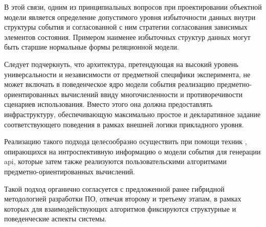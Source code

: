В этой связи, одним из принципиальных вопросов при проектировании объектной
модели является определение допустимого уровня избыточности данных
внутри структуры события и согласованной с ним стратегии
согласования зависимых элементов состояния. Примером наименее избыточных
структур данных могут быть старшие нормальные формы реляционной модели.

Следует подчеркнуть, что архитектура, претендующая на высокий уровень
универсальности и независимости от предметной специфики эксперимента, не может
включать в поведенческое ядро модели события реализацию предметно-ориентированных
вычислений ввиду многочисленности и противоречивости сценариев использования.
Вместо этого она должна предоставлять инфраструктуру, обеспечивающую
максимально простое и декларативное задание соответствующего поведения
в рамках внешней логики прикладного уровня.

Реализацию такого подхода целесообразно осуществить при помощи техник
, опирающихся на интроспективную информацию
о модели события для генерации \acrshort{api}, которые затем также
реализуются пользовательскими алгоритмами предметно-ориентированных
вычислений.

Такой подход органично согласуется с предложенной ранее гибридной
методологией разработки ПО, отвечая второму и третьему этапам, в рамках
которых для взаимодействующих алгоритмов фиксируются структурные и
поведенческие аспекты системы.

